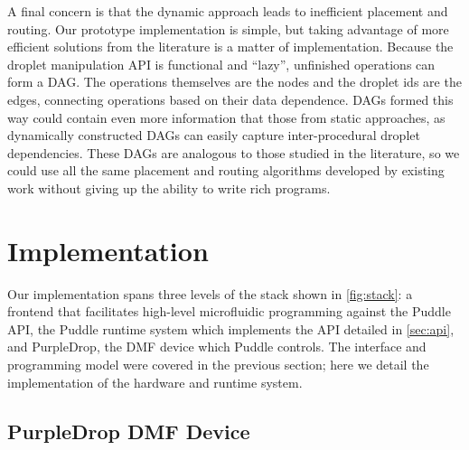 \documentclass{jpaper}
\newcommand\pavel[1]{\todo[color=blue!60]{\sf #1}}
\begin{document}
A final concern is that the dynamic approach leads to inefficient placement and routing.
Our prototype implementation is simple, but taking advantage of more efficient solutions from the literature \cite{bohringer2006parallel, grissom2012scheduling, keszocze2015routing, roy2010routing}
is a matter of implementation.
Because the droplet manipulation API is functional and ``lazy'', unfinished operations can form a DAG.
The operations themselves are the nodes and the droplet ids are the edges, connecting operations based on their data dependence.
DAGs formed this way could contain even more information that those from static approaches, as dynamically constructed DAGs can easily capture inter-procedural droplet dependencies.
These DAGs are analogous to those studied in the literature, so
we could use all the same placement and routing algorithms developed by existing work without giving up the ability to write rich programs.

\section{Implementation}
\label{sec:impl}

Our implementation spans three levels of the stack shown in \autoref{fig:stack}: a frontend that facilitates high-level microfluidic programming against the Puddle API, the Puddle runtime system which implements the API detailed in \autoref{sec:api}, and PurpleDrop, the DMF device which Puddle controls.
The interface and programming model were covered in the previous section; here we detail the implementation of the hardware and runtime system.
\pavel{reorder to go top-down}



\subsection{PurpleDrop DMF Device}
\end{document}
